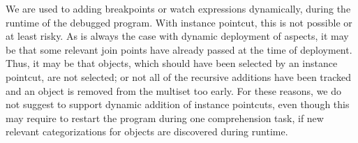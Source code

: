 We are used to adding breakpoints or watch expressions dynamically, during the runtime of the debugged program.
With instance pointcut, this is not possible or at least risky.
As is always the case with dynamic deployment of aspects, it may be that some relevant join points have already passed at the time of deployment.
Thus, it may be that objects, which should have been selected by an instance pointcut, are not selected; or not all of the recursive additions have been tracked and an object is removed from the multiset too early.
For these reasons, we do not suggest to support dynamic addition of instance pointcuts, even though this may require to restart the program during one comprehension task, if new relevant categorizations for objects are discovered during runtime.




